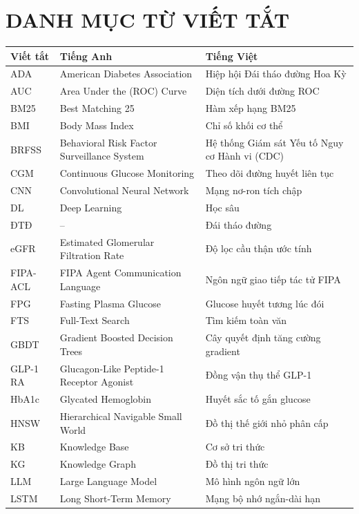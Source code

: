 \chapter*{DANH MỤC TỪ VIẾT TẮT}
\begin{spacing}{1.1}
\small
\begin{longtable}{@{}L{2.3cm}L{6.3cm}L{6.0cm}@{}}
\toprule
\textbf{Viết tắt} & \textbf{Tiếng Anh} & \textbf{Tiếng Việt} \\
\midrule
\endhead
ADA & American Diabetes Association & Hiệp hội Đái tháo đường Hoa Kỳ \\
AUC & Area Under the (ROC) Curve & Diện tích dưới đường ROC \\
BM25 & Best Matching 25 & Hàm xếp hạng BM25 \\
BMI & Body Mass Index & Chỉ số khối cơ thể \\
BRFSS & Behavioral Risk Factor Surveillance System & Hệ thống Giám sát Yếu tố Nguy cơ Hành vi (CDC) \\
CGM & Continuous Glucose Monitoring & Theo dõi đường huyết liên tục \\
CNN & Convolutional Neural Network & Mạng nơ-ron tích chập \\
DL & Deep Learning & Học sâu \\
ĐTĐ & -- & Đái tháo đường \\
eGFR & Estimated Glomerular Filtration Rate & Độ lọc cầu thận ước tính \\
FIPA-ACL & FIPA Agent Communication Language & Ngôn ngữ giao tiếp tác tử FIPA \\
FPG & Fasting Plasma Glucose & Glucose huyết tương lúc đói \\
FTS & Full-Text Search & Tìm kiếm toàn văn \\
GBDT & Gradient Boosted Decision Trees & Cây quyết định tăng cường gradient \\
GLP-1 RA & Glucagon-Like Peptide-1 Receptor Agonist & Đồng vận thụ thể GLP-1 \\
HbA1c & Glycated Hemoglobin & Huyết sắc tố gắn glucose \\
HNSW & Hierarchical Navigable Small World & Đồ thị thế giới nhỏ phân cấp \\
KB & Knowledge Base & Cơ sở tri thức \\
KG & Knowledge Graph & Đồ thị tri thức \\
LLM & Large Language Model & Mô hình ngôn ngữ lớn \\
LSTM & Long Short-Term Memory & Mạng bộ nhớ ngắn-dài hạn \\

\end{longtable}
\end{spacing}
